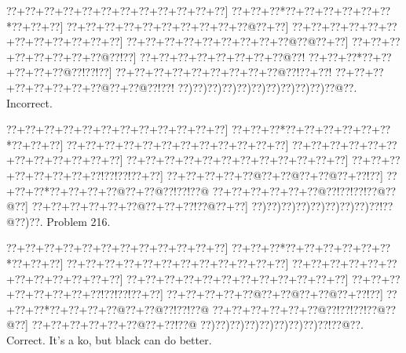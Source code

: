 \documentclass[a5paper]{article}
\begin{document}
\begin{center}
{\goo
\0??+\0??+\0??+\0??+\0??+\0??+\0??+\0??+\0??+\0??+\0??+\0??]
\0??+\0??+\0??*\0??+\0??+\0??+\0??+\0??+\0??*\0??+\0??+\0??]
\0??+\0??+\0??+\0??+\0??+\0??+\0??+\0??+\0??+\0??@\0??+\0??]
\0??+\0??+\0??+\0??+\0??+\0??+\0??+\0??+\0??+\0??+\0??+\0??]
\0??+\0??+\0??+\0??+\0??+\0??+\0??+\0??+\0??@\0??@\0??+\0??]
\0??+\0??+\0??+\0??+\0??+\0??+\0??+\0??@\0??!\0??]
\0??+\0??+\0??+\0??+\0??+\0??+\0??+\0??@\0??!
\0??+\0??+\0??*\0??+\0??+\0??+\0??+\0??@\0??!\0??!\0??]
\0??+\0??+\0??+\0??+\0??+\0??+\0??+\0??+\0??@\0??!\0??+\0??!
\0??+\0??+\0??+\0??+\0??+\0??+\0??+\0??@\0??+\0??@\0??!\0??!
\0??)\0??)\0??)\0??)\0??)\0??)\0??)\0??)\0??)\0??)\0??@\0??.
}
Incorrect. 

\end{center}
\newpage
\begin{center}
{\goo
\0??+\0??+\0??+\0??+\0??+\0??+\0??+\0??+\0??+\0??+\0??+\0??]
\0??+\0??+\0??*\0??+\0??+\0??+\0??+\0??+\0??*\0??+\0??+\0??]
\0??+\0??+\0??+\0??+\0??+\0??+\0??+\0??+\0??+\0??+\0??+\0??]
\0??+\0??+\0??+\0??+\0??+\0??+\0??+\0??+\0??+\0??+\0??+\0??]
\0??+\0??+\0??+\0??+\0??+\0??+\0??+\0??+\0??+\0??+\0??+\0??]
\0??+\0??+\0??+\0??+\0??+\0??+\0??+\0??!\0??!\0??!\0??+\0??]
\0??+\0??+\0??+\0??+\0??@\0??+\0??@\0??+\0??@\0??+\0??!\0??]
\0??+\0??+\0??*\0??+\0??+\0??+\0??@\0??+\0??@\0??!\0??!\0??@
\0??+\0??+\0??+\0??+\0??+\0??@\0??!\0??!\0??!\0??@\0??@\0??]
\0??+\0??+\0??+\0??+\0??+\0??@\0??+\0??+\0??!\0??@\0??+\0??]
\0??)\0??)\0??)\0??)\0??)\0??)\0??)\0??)\0??!\0??@\0??)\0??.
}
Problem 216.

\end{center}
\begin{center}
{\goo
\0??+\0??+\0??+\0??+\0??+\0??+\0??+\0??+\0??+\0??+\0??+\0??]
\0??+\0??+\0??*\0??+\0??+\0??+\0??+\0??+\0??*\0??+\0??+\0??]
\0??+\0??+\0??+\0??+\0??+\0??+\0??+\0??+\0??+\0??+\0??+\0??]
\0??+\0??+\0??+\0??+\0??+\0??+\0??+\0??+\0??+\0??+\0??+\0??]
\0??+\0??+\0??+\0??+\0??+\0??+\0??+\0??+\0??+\0??+\0??+\0??]
\0??+\0??+\0??+\0??+\0??+\0??+\0??+\0??!\0??!\0??!\0??+\0??]
\0??+\0??+\0??+\0??+\0??@\0??+\0??@\0??+\0??@\0??+\0??!\0??]
\0??+\0??+\0??*\0??+\0??+\0??+\0??@\0??+\0??@\0??!\0??!\0??@
\0??+\0??+\0??+\0??+\0??+\0??@\0??!\0??!\0??!\0??@\0??@\0??]
\0??+\0??+\0??+\0??+\0??+\0??@\0??+\0??!\0??@
\0??)\0??)\0??)\0??)\0??)\0??)\0??)\0??)\0??!\0??@\0??.
}
Correct. It's a ko, but black can do better. 

\end{center}
\end{document}

